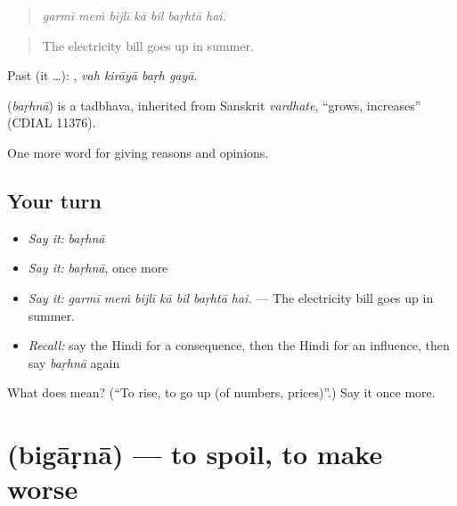 \begin{quote}
      
\end{quote}

\begin{quote}
\emph{garmī meṁ bijlī kā bil baṛhtā hai.}
\end{quote}

\begin{quote}
The electricity bill goes up in summer.
\end{quote}

Past (it …):    , \emph{vah kirāyā baṛh gayā}.

\begin{cousinweb}
\textbf{} (\emph{baṛhnā}) is a tadbhava, inherited from Sanskrit \emph{vardhate}, \textquotedblleft{}grows, increases\textquotedblright{} (CDIAL 11376).
\end{cousinweb}

\begin{grammarlens}[title={What you've built}]
One more word for giving reasons and opinions.
\end{grammarlens}

\subsection*{Your turn}
\begin{itemize}
\raggedright
  \item \emph{Say it:} \emph{baṛhnā}
  \item \emph{Say it:} \emph{baṛhnā}, once more
  \item \emph{Say it:} \emph{garmī meṁ bijlī kā bil baṛhtā hai.} — The electricity bill goes up in summer.
  \item \emph{Recall:} say the Hindi for a consequence, then the Hindi for an influence, then say \emph{baṛhnā} again
\end{itemize}

\begin{tcolorbox}[breakable,colback=teal!4,colframe=teal!35!black,title={Before you move on}]
What does  mean? (\textquotedblleft{}To rise, to go up (of numbers, prices)\textquotedblright{}.) Say it once more.
\end{tcolorbox}
\section[\texorpdfstring{\hi{बिगाड़ना} (bigāṛnā)}{बिगाड़ना (bigāṛnā)}]{ (bigāṛnā) — to spoil, to make worse}

